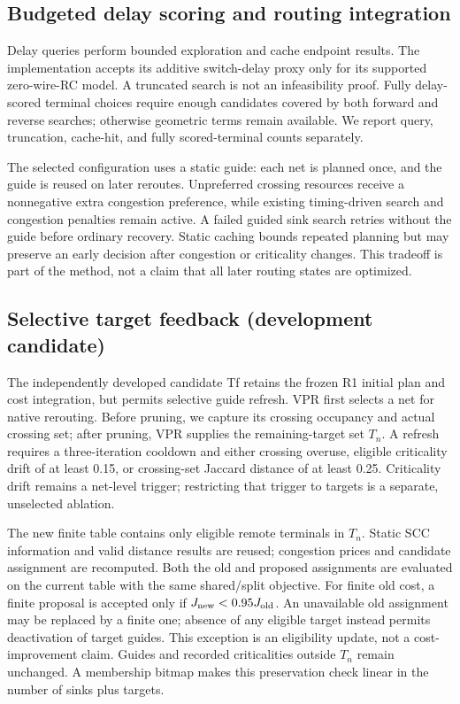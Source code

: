 \documentclass[conference,10pt]{IEEEtran}
\begin{document}
\subsection{Budgeted delay scoring and routing integration}
Delay queries perform bounded exploration and cache endpoint results. The implementation accepts its additive switch-delay proxy only for its supported zero-wire-RC model. A truncated search is not an infeasibility proof. Fully delay-scored terminal choices require enough candidates covered by both forward and reverse searches; otherwise geometric terms remain available. We report query, truncation, cache-hit, and fully scored-terminal counts separately.

The selected configuration uses a static guide: each net is planned once, and the guide is reused on later reroutes. Unpreferred crossing resources receive a nonnegative extra congestion preference, while existing timing-driven search and congestion penalties remain active. A failed guided sink search retries without the guide before ordinary recovery. Static caching bounds repeated planning but may preserve an early decision after congestion or criticality changes. This tradeoff is part of the method, not a claim that all later routing states are optimized.

\subsection{Selective target feedback (development candidate)}
The independently developed candidate Tf retains the frozen R1 initial plan and cost integration, but permits selective guide refresh. VPR first selects a net for native rerouting. Before pruning, we capture its crossing occupancy and actual crossing set; after pruning, VPR supplies the remaining-target set $T_n$. A refresh requires a three-iteration cooldown and either crossing overuse, eligible criticality drift of at least 0.15, or crossing-set Jaccard distance of at least 0.25. Criticality drift remains a net-level trigger; restricting that trigger to targets is a separate, unselected ablation.

The new finite table contains only eligible remote terminals in $T_n$. Static SCC information and valid distance results are reused; congestion prices and candidate assignment are recomputed. Both the old and proposed assignments are evaluated on the current table with the same shared/split objective. For finite old cost, a finite proposal is accepted only if $J_{\rm new}<0.95J_{\rm old}$. An unavailable old assignment may be replaced by a finite one; absence of any eligible target instead permits deactivation of target guides. This exception is an eligibility update, not a cost-improvement claim. Guides and recorded criticalities outside $T_n$ remain unchanged. A membership bitmap makes this preservation check linear in the number of sinks plus targets.
\end{document}
